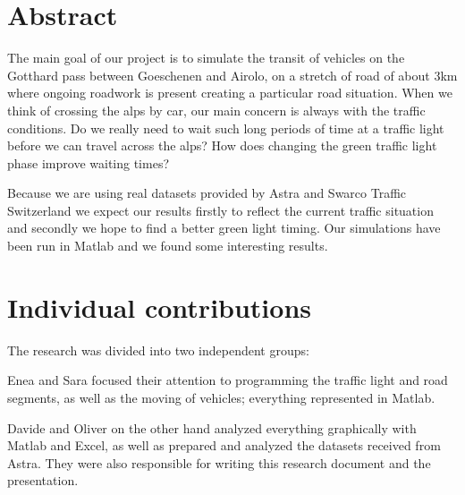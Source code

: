 \documentclass[11pt,a4paper,parskip=half-]{article}
\begin{document}
\newpage









\section{Abstract}

The main goal of our project is to simulate the transit of vehicles on the Gotthard pass between Goeschenen and Airolo, on a stretch of road of about 3km where ongoing roadwork is present creating a particular road situation. When we think of crossing the alps by car, our main concern is always with the traffic conditions. Do we really need to wait such long periods of time at a traffic light before we can travel across the alps? How does changing the green traffic light phase improve waiting times? 

Because we are using real datasets provided by Astra and Swarco Traffic Switzerland we expect our results firstly to reflect the current traffic situation and secondly we hope to find a better green light timing. Our simulations have been run in Matlab and we found some interesting results. 








\section{Individual contributions}

The research was divided into two independent groups: \par 
\vspace{1mm}
Enea and Sara focused their attention to programming the traffic light and road segments, as well as the moving of vehicles; everything represented in Matlab.
\vspace{3mm}

Davide and Oliver on the other hand analyzed everything graphically with Matlab and Excel, as well as prepared and analyzed the datasets received from Astra. They were also responsible for writing this research document and the presentation.
\end{document}
